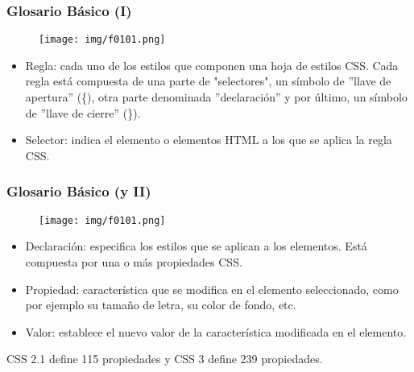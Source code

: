 
\begin{frame}
\frametitle{Glosario Básico (I)}

\begin{center}
\begin{figure}[p]
\texttt{[image: img/f0101.png]}
\end{figure}
\end{center}

\begin{itemize}
  \item Regla: cada uno de los estilos que componen una hoja de estilos CSS. Cada regla está compuesta de una parte de "selectores", un símbolo de ''llave de apertura'' (\{), otra parte denominada ''declaración'' y por último, un símbolo de ''llave de cierre'' (\}).
  \item Selector: indica el elemento o elementos HTML a los que se aplica la regla CSS.
\end{itemize}

\end{frame}


\begin{frame}
\frametitle{Glosario Básico (y II)}

\begin{center}
\begin{figure}[p]
\texttt{[image: img/f0101.png]}
\end{figure}
\end{center}

\begin{itemize}
  \item Declaración: especifica los estilos que se aplican a los elementos. Está compuesta por una o más propiedades CSS.
  \item Propiedad: característica que se modifica en el elemento seleccionado, como por ejemplo su tamaño de letra, su color de fondo, etc.
  \item Valor: establece el nuevo valor de la característica modificada en el elemento.
\end{itemize}

CSS 2.1 define 115 propiedades y CSS 3 define 239 propiedades.

\end{frame}


